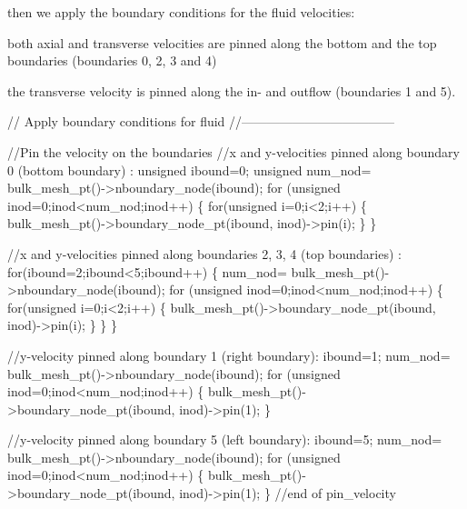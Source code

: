 then we apply the boundary conditions for the fluid velocities\+:
\begin{DoxyItemize}
\item both axial and transverse velocities are pinned along the bottom and the top boundaries (boundaries 0, 2, 3 and 4)
\item the transverse velocity is pinned along the in-\/ and outflow (boundaries 1 and 5).
\end{DoxyItemize}
\begin{DoxyCodeInclude}



 \textcolor{comment}{// Apply boundary conditions for fluid}
 \textcolor{comment}{//------------------------------------}

 \textcolor{comment}{//Pin the velocity on the boundaries}
 \textcolor{comment}{//x and y-velocities pinned along boundary 0 (bottom boundary) :}
 \textcolor{keywordtype}{unsigned} ibound=0; 
 \textcolor{keywordtype}{unsigned} num\_nod= bulk\_mesh\_pt()->nboundary\_node(ibound);
 \textcolor{keywordflow}{for} (\textcolor{keywordtype}{unsigned} inod=0;inod<num\_nod;inod++)
  \{
   \textcolor{keywordflow}{for}(\textcolor{keywordtype}{unsigned} i=0;i<2;i++)
    \{
     bulk\_mesh\_pt()->boundary\_node\_pt(ibound, inod)->pin(i);
    \}
  \}
  
 \textcolor{comment}{//x and y-velocities pinned along boundaries 2, 3, 4 (top boundaries) :}
 \textcolor{keywordflow}{for}(ibound=2;ibound<5;ibound++)
  \{ 
   num\_nod= bulk\_mesh\_pt()->nboundary\_node(ibound);
   \textcolor{keywordflow}{for} (\textcolor{keywordtype}{unsigned} inod=0;inod<num\_nod;inod++)
    \{
     \textcolor{keywordflow}{for}(\textcolor{keywordtype}{unsigned} i=0;i<2;i++)
      \{
       bulk\_mesh\_pt()->boundary\_node\_pt(ibound, inod)->pin(i);
      \}
    \}
  \}

 \textcolor{comment}{//y-velocity pinned along boundary 1 (right boundary):}
 ibound=1; 
 num\_nod= bulk\_mesh\_pt()->nboundary\_node(ibound);
 \textcolor{keywordflow}{for} (\textcolor{keywordtype}{unsigned} inod=0;inod<num\_nod;inod++)
  \{
   bulk\_mesh\_pt()->boundary\_node\_pt(ibound, inod)->pin(1);
  \}


 \textcolor{comment}{//y-velocity pinned along boundary 5 (left boundary):}
 ibound=5; 
 num\_nod= bulk\_mesh\_pt()->nboundary\_node(ibound);
 \textcolor{keywordflow}{for} (\textcolor{keywordtype}{unsigned} inod=0;inod<num\_nod;inod++)
  \{
   bulk\_mesh\_pt()->boundary\_node\_pt(ibound, inod)->pin(1);
  \}
\textcolor{comment}{//end of pin\_velocity}

\end{DoxyCodeInclude}


